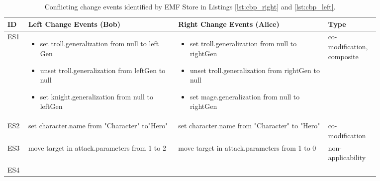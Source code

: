 \begin{table*}[ht]
  \centering
  \caption{Conflicting change events identified by EMF Store in Listings \ref{lst:cbp_right} and \ref{lst:cbp_left}.}
  \label{table:conflicts_emfs}
  \begin{scriptsize}
    \begin{tabular}{|p{0.04\linewidth}|p{0.36\linewidth}|p{0.36\linewidth}|
        p{0.11\linewidth}|}
      \hline
      \textbf{ID} &
      \textbf{Left Change Events (Bob)} &
      \textbf{Right Change Events (Alice)} &
      \textbf{Type}\\
      \hline
      ES1 &
      \begin{minipage}[t]{\linewidth}
        \raggedright
        \begin{itemize}[leftmargin=0pt]
          \setlength
          \item[] set troll.generalization from null to left
          Gen
          \item[] unset troll.generalization from leftGen
          to null
          \item[] set knight.generalization from null
          to leftGen
        \end{itemize}
      \end{minipage} &
      \begin{minipage}[t]{\linewidth}
        \raggedright
        \begin{itemize}[leftmargin=0pt]
          \setlength
          \item[] set troll.generalization from null to
          rightGen
          \item[] unset troll.generalization from rightGen
          to null
          \item[] set mage.generalization from null to
          rightGen
        \end{itemize}
      \end{minipage} &
      co-modification,
      composite \\
      \hline
      ES2 & set character.name from "Character"
      to"Hero" &
      set character.name from "Character"
      to "Hero" &
      co-modification \\
      \hline
      ES3 &
      move target in attack.parameters from
      1 to 2
      &
      move target in attack.parameters from
      1 to 0
      &
      non-applicability\\
      \hline
      ES4 &
      \begin{minipage}[t]{\linewidth}
        \raggedright

\end{minipage}
\end{tabular}
\end{scriptsize}
\end{table*}
